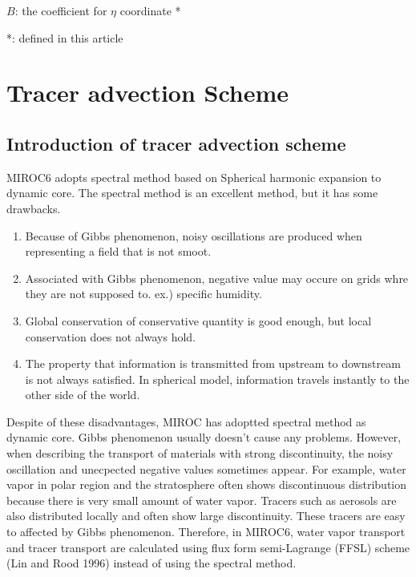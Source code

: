 \documentclass{article}
\begin{document}
$B$: the coefficient for $\eta$ coordinate *                       
                                                                           
  *: defined in this article    
\section{Tracer advection Scheme}
\subsection{Introduction of tracer advection scheme}
MIROC6 adopts spectral method based on Spherical harmonic expansion to dynamic core.
The spectral method is an excellent method, but it has some drawbacks.
\begin{enumerate}
\item Because of Gibbs phenomenon, noisy oscillations are produced when representing a field that is not smoot. 
\item Associated with Gibbs phenomenon, negative value may occure on grids whre they are not supposed to. ex.) specific humidity.
\item Global conservation of conservative quantity is good enough, but local conservation does not always hold.
\item The property that information is transmitted from upstream to downstream is not always satisfied. In spherical model, information travels instantly to the other side of the world.
\end{enumerate}
Despite of these disadvantages, MIROC has adoptted spectral method as dynamic core.
Gibbs phenomenon usually doesn't cause any problems. 
However, when describing the transport of materials with strong discontinuity, the noisy oscillation and unecpected negative values sometimes appear.
For example, water vapor in polar region and the stratosphere often shows discontinuous distribution because there is very small amount of water vapor.
Tracers such as aerosols are also distributed locally and often show large discontinuity.
These tracers are easy to affected by Gibbs phenomenon.
Therefore, in MIROC6, water vapor transport and tracer transport are calculated using flux form semi-Lagrange (FFSL) scheme (Lin and Rood 1996) instead of using the spectral method.
\end{document}
